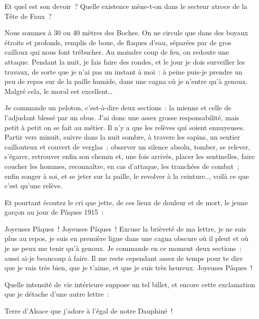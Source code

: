 \documentclass[french,twoside]{book} %
\newenvironment{quoteblock}%
  {\begin{quoting}}
  {\end{quoting}}
\newenvironment{quotebar}{%
    \def\FrameCommand{{\color{rubric!10!}\vrule width 0.5em} \hspace{0.9em}}%
    \def\OuterFrameSep{\itemsep} %
    \MakeFramed {\advance\hsize-\width \FrameRestore}
  }%
  {%
    \endMakeFramed
  }
\renewenvironment{quoteblock}%
  {%
    \savenotes
    \setstretch{0.9}
    \normalfont
    \begin{quotebar}
  }
  {%
    \end{quotebar}
    \spewnotes
  }
\begin{document}
\noindent Et quel est son devoir ? Quelle existence mène-t-on dans le secteur atroce de la Tête de Faux ?‌\par

\begin{quoteblock}
 \noindent Nous sommes à 30 ou 40 mètres des Boches. On ne circule que dans des boyaux étroits et profonds, remplis de boue, de flaques d’eau, séparées par de gros cailloux qui nous font trébucher. Au moindre coup de feu, on redoute une attaque. Pendant la nuit, je fais faire des rondes, et le jour je dois surveiller les travaux, de sorte que je n’ai pas un instant à moi : à peine puis-je prendre un peu de repos sur de la paille humide, dans une cagna où je n’entre qu’à genoux. Malgré cela, le moral est excellent…‌\par
 Je commande un peloton, c’est-à-dire deux sections : la mienne et celle de l’adjudant blessé par un obus. J’ai donc une assez grosse responsabilité, mais petit à petit on se fait au métier. Il n’y a que les relèves qui soient ennuyeuses. Partir vers minuit, suivre dans la nuit sombre, à travers les sapins, un sentier caillouteux et couvert de verglas ; observer un silence absolu, tomber, se relever, s’égarer, retrouver enfin son chemin et, une fois arrivés, placer les sentinelles, faire coucher les hommes, reconnaître, en cas d’attaque, les tranchées de combat ; enfin songer à soi, et se jeter sur la paille, le revolver à la ceinture.., voilà ce que c’est qu’une relève.‌
 \end{quoteblock}

\noindent Et pourtant écoutez le cri que jette, de ces lieux de douleur et de mort, le jeune garçon au jour de Pâques 1915 :‌\par

\begin{quoteblock}
 \noindent Joyeuses Pâques ! Joyeuses Pâques ! Excuse la brièveté de ma lettre, je ne suis plus au repos, je suis en première ligne dans une cagna obscure où il pleut et où je ne peux me tenir qu’à genoux. Je commande en ce moment deux sections : aussi ai-je beaucoup à faire. Il me reste cependant assez de temps pour te dire que je vais très bien, que je t’aime, et que je suis très heureux. Joyeuses Pâques !‌
 \end{quoteblock}

\noindent Quelle intensité de vie intérieure suppose un tel billet, et encore cette exclamation que je détache d’une autre lettre :‌\par

\begin{quoteblock}
 \noindent Terre d’Alsace que j’adore à l’égal de notre Dauphiné !‌
 \end{quoteblock}
\end{document}
